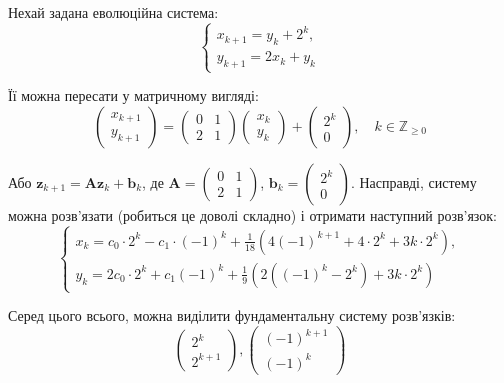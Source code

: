 \documentclass{hw_template}
\begin{document}
\begin{example}
    Нехай задана еволюційна система:
    \begin{equation*}
        \begin{cases}
            x_{k+1} = y_k + 2^k, \\
            y_{k+1} = 2x_k + y_k
        \end{cases}
    \end{equation*}

    Її можна пересати у матричному вигляді:
    \begin{equation*}
        \begin{pmatrix}
            x_{k+1} \\ y_{k+1}
        \end{pmatrix} = \begin{pmatrix}
            0 & 1 \\ 2 & 1
        \end{pmatrix}\begin{pmatrix}
            x_k \\ y_k
        \end{pmatrix} + \begin{pmatrix}
            2^k \\ 0
        \end{pmatrix}, \quad k \in \mathbb{Z}_{\geq 0}
    \end{equation*}

    Або $\mathbf{z}_{k+1} = \boldsymbol{A}\mathbf{z}_k + \mathbf{b}_k$, де $\boldsymbol{A} = \begin{pmatrix}
        0 & 1 \\ 2 & 1
    \end{pmatrix}$, $\mathbf{b}_k = \begin{pmatrix}
        2^k \\ 0
    \end{pmatrix}$. Насправді, систему можна розв'язати (робиться це доволі складно) і отримати наступний розв'язок:
    \begin{equation*}
        \begin{cases}
        x_k = c_0 \cdot 2^k - c_1 \cdot (-1)^k + \frac{1}{18}\left(4(-1)^{k+1}+4 \cdot 2^k + 3k\cdot 2^k\right), \\
        y_k = 2c_0 \cdot 2^k + c_1(-1)^k + \frac{1}{9}\left(2((-1)^k - 2^k)+ 3k \cdot 2^k\right)
        \end{cases}
    \end{equation*}

    Серед цього всього, можна виділити фундаментальну систему розв'язків:
    \begin{equation*}
        \begin{pmatrix}
            2^k \\ 2^{k+1}
        \end{pmatrix}, \begin{pmatrix}
            (-1)^{k+1} \\ (-1)^k
        \end{pmatrix}
    \end{equation*}


\end{example}
\end{document}
